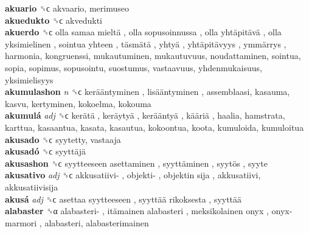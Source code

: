 \textbf{akuario} ␝ϲ  akvaario, merimuseo  \\
\textbf{akuedukto} ␝ϲ  akvedukti  \\
\textbf{akuerdo} ␝ϲ   olla samaa mieltä ,  olla sopusoinnussa ,  olla yhtäpitävä ,  olla yksimielinen ,  sointua yhteen ,  täsmätä ,  yhtyä ,  yhtäpitävyys ,  ymmärrys , harmonia, kongruenssi, mukautuminen, mukautuvuus, noudattaminen, sointua, sopia, sopimus, sopusointu, suostumus, vastaavuus, yhdenmukaisuus, yksimielisyys  \\
\textbf{akumulashon} \emph{n}  ␝ϲ   kerääntyminen ,  lisääntyminen , assemblaasi, kasauma, kasvu, kertyminen, kokoelma, kokouma  \\
\textbf{akumulá} \emph{adj}  ␝ϲ   kerätä ,  keräytyä ,  kerääntyä ,  kääriä , haalia, hamstrata, karttua, kasaantua, kasata, kasautua, kokoontua, koota, kumuloida, kumuloitua  \\
\textbf{akusado} ␝ϲ  syytetty, vastaaja  \\
\textbf{akusadó} ␝ϲ   syyttäjä   \\
\textbf{akusashon} ␝ϲ   syytteeseen asettaminen ,  syyttäminen ,  syytös , syyte  \\
\textbf{akusativo} \emph{adj}  ␝ϲ   akkusatiivi- ,  objekti- ,  objektin sija , akkusatiivi, akkusatiivisija  \\
\textbf{akusá} \emph{adj}  ␝ϲ   asettaa syytteeseen ,  syyttää rikoksesta ,  syyttää   \\
\textbf{alabaster} ␝α   alabasteri- ,  itämainen alabasteri ,  meksikolainen onyx ,  onyx-marmori , alabasteri, alabasterimainen  \\
